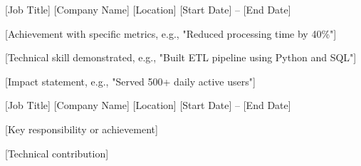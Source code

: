 \begin{cventries}
  \cventry
    {[Job Title]} %
    {[Company Name]} %
    {[Location]} %
    {[Start Date] -- [End Date]} %
    {
      \begin{cvitems}
        \item {[Achievement with specific metrics, e.g., "Reduced processing time by 40\%"]}
        \item {[Technical skill demonstrated, e.g., "Built ETL pipeline using Python and SQL"]}
        \item {[Impact statement, e.g., "Served 500+ daily active users"]}
      \end{cvitems}
    }
  \cventry
    {[Job Title]} %
    {[Company Name]} %
    {[Location]} %
    {[Start Date] -- [End Date]} %
    {
      \begin{cvitems}
        \item {[Key responsibility or achievement]}
        \item {[Technical contribution]}
      \end{cvitems}
    }
\end{cventries}
